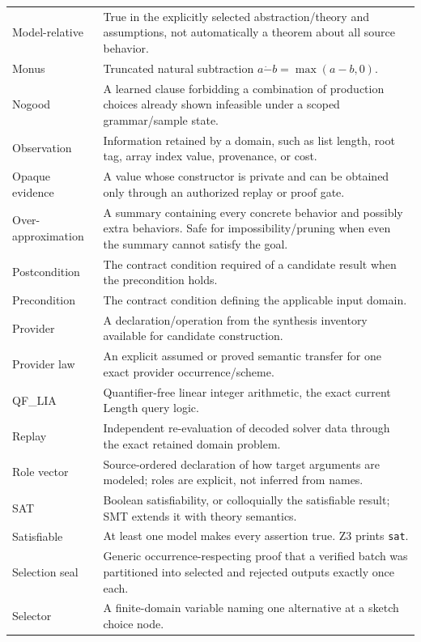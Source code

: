 \documentclass[10pt,letterpaper,oneside]{report}
\newcommand{\sat}{\texttt{sat}}
\begin{document}
\begin{longtable}{@{}L{0.23\textwidth}L{0.71\textwidth}@{}}
Model-relative & True in the explicitly selected abstraction/theory and assumptions, not automatically a theorem about all source behavior. \\
Monus & Truncated natural subtraction $a\mathbin{\dot{-}}b=\max(a-b,0)$. \\
Nogood & A learned clause forbidding a combination of production choices already shown infeasible under a scoped grammar/sample state. \\
Observation & Information retained by a domain, such as list length, root tag, array index value, provenance, or cost. \\
Opaque evidence & A value whose constructor is private and can be obtained only through an authorized replay or proof gate. \\
Over-approximation & A summary containing every concrete behavior and possibly extra behaviors. Safe for impossibility/pruning when even the summary cannot satisfy the goal. \\
Postcondition & The contract condition required of a candidate result when the precondition holds. \\
Precondition & The contract condition defining the applicable input domain. \\
Provider & A declaration/operation from the synthesis inventory available for candidate construction. \\
Provider law & An explicit assumed or proved semantic transfer for one exact provider occurrence/scheme. \\
QF\_LIA & Quantifier-free linear integer arithmetic, the exact current Length query logic. \\
Replay & Independent re-evaluation of decoded solver data through the exact retained domain problem. \\
Role vector & Source-ordered declaration of how target arguments are modeled; roles are explicit, not inferred from names. \\
SAT & Boolean satisfiability, or colloquially the satisfiable result; SMT extends it with theory semantics. \\
Satisfiable & At least one model makes every assertion true. Z3 prints \sat. \\
Selection seal & Generic occurrence-respecting proof that a verified batch was partitioned into selected and rejected outputs exactly once each. \\
Selector & A finite-domain variable naming one alternative at a sketch choice node. \\

\end{longtable}
\end{document}
